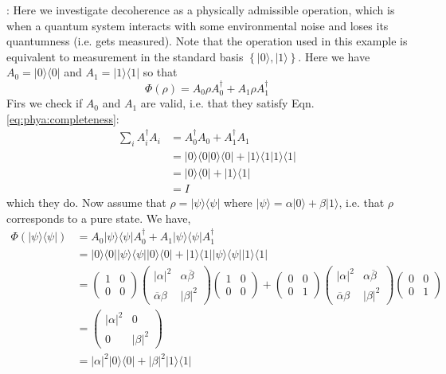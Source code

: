 \documentclass[11pt]{article}
\newcommand{\abs}[1]{\left\lvert #1 \right\rvert}
\newcommand{\set}[1]{\left\{ #1 \right\}}
\newcommand{\conj}[1]{\overline{#1}}
\newcommand{\op}[2]{#1#2#1^\dag}
\newcommand{\bra}[1]{\langle #1 \rvert}
\newcommand{\ket}[1]{\lvert #1 \rangle}
\newcommand{\bret}[2]{\langle{#1}|{#2}\rangle}
\newcommand{\kret}[2]{\ket{#1}\bra{#2}}
\newcommand{\kera}[1]{\kret{#1}{#1}}
\newcommand{\Example}[1]{{\bf Example #1}:}
\begin{document}
\noindent \Example{1} Here we investigate decoherence as a physically admissible operation, which is when a quantum system interacts with some environmental noise and loses its quantumness (i.e. gets measured). Note that the operation used in this example is equivalent to measurement in the standard basis $\set{\ket{0}, \ket{1}}$. Here we have $A_0 = \kera{0}$ and $A_1 = \kera{1}$ so that
\begin{equation*}
\Phi(\rho) = \op{A_0}{\rho} + \op{A_1}{\rho}
\end{equation*}
Firs we check if $A_0$ and $A_1$ are valid, i.e. that they satisfy Eqn. \ref{eq:phya:completeness}:
\begin{align*}
\sum_{i} A^\dag_iA_i
&= A^\dag_0A_0 + A^\dag_1A_1 \\
&= \ket{0}\bret{0}{0}\bra{0} + \ket{1}\bret{1}{1}\bra{1} \\
&= \kera{0} + \kera{1} \\
&= I
\end{align*}
which they do. Now assume that $\rho=\kera{\psi}$ where $\ket{\psi} = \alpha\ket{0} + \beta\ket{1}$, i.e. that $\rho$ corresponds to a pure state. We have,
\begin{align*}
\Phi(\kera{\psi}) 
&= \op{A_0}{\kera{\psi}} + \op{A_1}{\kera{\psi}} \\
&= \kera{0}\kera{\psi}\kera{0} + \kera{1}\kera{\psi}\kera{1} \\
&= \left(\begin{array}{cc}
1 & 0 \\
0 & 0
\end{array}\right)
\left(\begin{array}{cc}
\abs{\alpha}^2 & \alpha\conj{\beta} \\
\conj{\alpha}\beta & \abs{\beta}^2
\end{array}
\right)
\left(\begin{array}{cc}
1 & 0 \\
0 & 0
\end{array}\right) + \left(\begin{array}{cc}
0 & 0 \\
0 & 1
\end{array}\right)
\left(\begin{array}{cc}
\abs{\alpha}^2 & \alpha\conj{\beta} \\
\conj{\alpha}\beta & \abs{\beta}^2
\end{array}
\right)
\left(\begin{array}{cc}
0 & 0 \\
0 & 1
\end{array}\right) \\
&= \left(\begin{array}{cc}
\abs{\alpha}^2 & 0 \\
0 & \abs{\beta}^2
\end{array}
\right) \\
&= \abs{\alpha}^2\kera{0} + \abs{\beta}^2\kera{1}
\end{align*}
\end{document}

